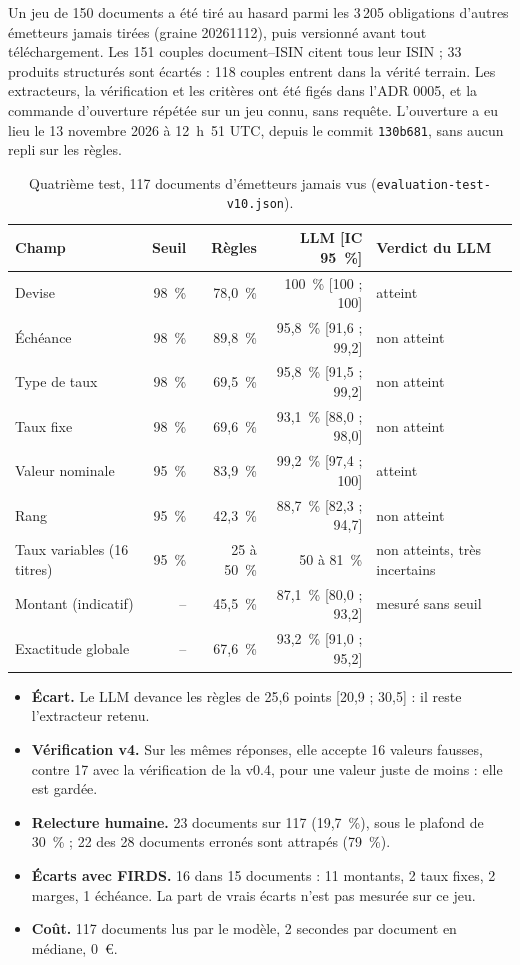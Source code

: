 \documentclass[11pt,a4paper]{article}
\begin{document}
Un jeu de 150 documents a été tiré au hasard parmi les 3\,205 obligations d'autres émetteurs jamais tirées (graine 20261112), puis versionné avant tout téléchargement. Les 151 couples document--ISIN citent tous leur ISIN ; 33 produits structurés sont écartés : 118 couples entrent dans la vérité terrain. Les extracteurs, la vérification et les critères ont été figés dans l'ADR 0005, et la commande d'ouverture répétée sur un jeu connu, sans requête. L'ouverture a eu lieu le 13 novembre 2026 à 12~h~51 UTC, depuis le commit \texttt{130b681}, sans aucun repli sur les règles.

\begin{table}[H]
\small
\begin{tabularx}{\linewidth}{Yrrrl}
\toprule
\textbf{Champ} & \textbf{Seuil} & \textbf{Règles} & \textbf{LLM [IC 95~\%]} & \textbf{Verdict du LLM} \\
\midrule
Devise & 98~\% & 78,0~\% & 100~\% [100 ; 100] & atteint \\
Échéance & 98~\% & 89,8~\% & 95,8~\% [91,6 ; 99,2] & non atteint \\
Type de taux & 98~\% & 69,5~\% & 95,8~\% [91,5 ; 99,2] & non atteint \\
Taux fixe & 98~\% & 69,6~\% & 93,1~\% [88,0 ; 98,0] & non atteint \\
Valeur nominale & 95~\% & 83,9~\% & 99,2~\% [97,4 ; 100] & atteint \\
Rang & 95~\% & 42,3~\% & 88,7~\% [82,3 ; 94,7] & non atteint \\
Taux variables (16 titres) & 95~\% & 25 à 50~\% & 50 à 81~\% & non atteints, très incertains \\
Montant (indicatif) & -- & 45,5~\% & 87,1~\% [80,0 ; 93,2] & mesuré sans seuil \\
\midrule
Exactitude globale & -- & 67,6~\% & 93,2~\% [91,0 ; 95,2] & \\
\bottomrule
\end{tabularx}
\caption{Quatrième test, 117 documents d'émetteurs jamais vus (\texttt{evaluation-test-v10.json}).}
\end{table}

\begin{itemize}
  \item \textbf{Écart.} Le LLM devance les règles de 25,6 points [20,9 ; 30,5] : il reste l'extracteur retenu.
  \item \textbf{Vérification v4.} Sur les mêmes réponses, elle accepte 16 valeurs fausses, contre 17 avec la vérification de la v0.4, pour une valeur juste de moins : elle est gardée.
  \item \textbf{Relecture humaine.} 23 documents sur 117 (19,7~\%), sous le plafond de 30~\% ; 22 des 28 documents erronés sont attrapés (79~\%).
  \item \textbf{Écarts avec FIRDS.} 16 dans 15 documents : 11 montants, 2 taux fixes, 2 marges, 1 échéance. La part de vrais écarts n'est pas mesurée sur ce jeu.
  \item \textbf{Coût.} 117 documents lus par le modèle, 2 secondes par document en médiane, 0~€.
\end{itemize}
\end{document}
